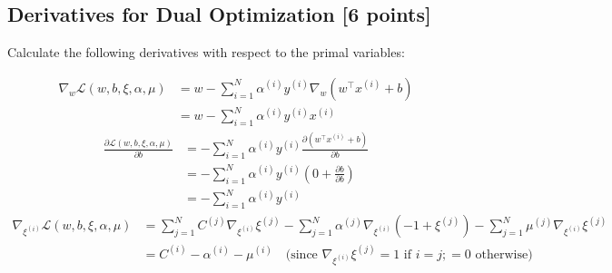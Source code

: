 \documentclass[lang=cn,11pt]{elegantbook}
\begin{document}
\subsection{Derivatives for Dual Optimization [6 points]}
Calculate the following derivatives with respect to the primal variables:
\begin{solution} \begin{align}
      \nabla_w \mathcal{L}(w, b, \xi, \alpha, \mu) &=  w  - \sum_{i=1}^{N} \alpha^{(i)}  y^{(i)} \nabla_w (w^\top x^{(i)} + b)  \\
      &= w - \sum_{i=1}^{N} \alpha^{(i)} y^{(i)} x^{(i)}
\end{align}\begin{align}
    \frac{\partial \mathcal{L}(w,b,\xi,\alpha,\mu)}{\partial b} &= - \sum_{i=1}^{N} \alpha^{(i)}  y^{(i)}  \frac{\partial (w^\top x^{(i)} + b)}{\partial b} \\
    &= -\sum_{i=1}^{N} \alpha^{(i)} y^{(i)} (0+\frac{\partial b}{\partial b}) \\
    &= -\sum_{i=1}^{N} \alpha^{(i)} y^{(i)}
 \end{align}\begin{align}
    \nabla_{\xi^{(i)}} \mathcal{L}(w, b, \xi, \alpha, \mu) &= \sum_{j=1}^{N} C^{(j)}   \nabla_{\xi^{(i)}} \xi^{(j)} - \sum_{j=1}^{N} \alpha^{(j)} \nabla_{\xi^{(i)}}\left(- 1 + \xi^{(j)} \right) - \sum_{j=1}^{N} \mu^{(j)}\nabla_{\xi^{(i)}} \xi^{(j)} \\
    & =  C^{(i)} - \alpha^{(i)} - \mu^{(i)} \quad \text{(since } \nabla_{\xi^{(i)}} \xi^{(j)} = 1 \text{ if } i=j;  = 0 \text{ otherwise)} 
\end{align}
\end{solution}
\end{document}
